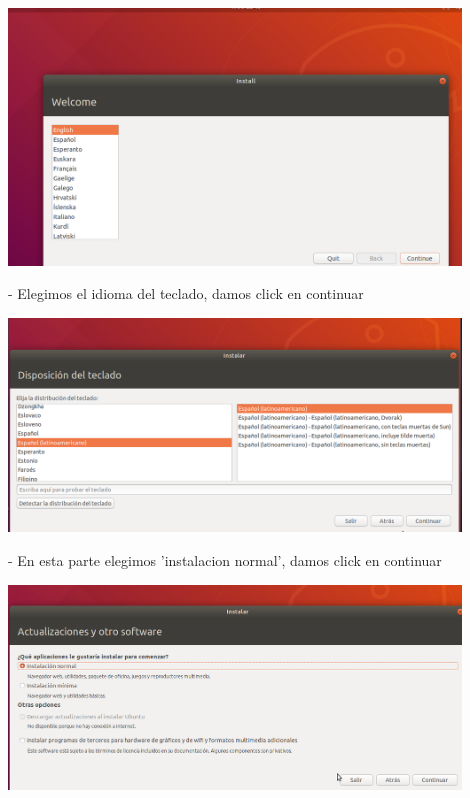 \documentclass[12pt,letterpaper]{article}
\begin{document}
\begin{center}
	\includegraphics[width=12cm]{./Imagenes/16} 
\end{center}

\begin{itemize}
- Elegimos el idioma del teclado, damos click en continuar\\
\end{itemize}

\begin{center}
	\includegraphics[width=12cm]{./Imagenes/17} 
\end{center}


\begin{itemize}
- En esta parte elegimos 'instalacion normal', damos click en continuar\\
\end{itemize}

\begin{center}
	\includegraphics[width=12cm]{./Imagenes/18} 
\end{center}
\end{document}
